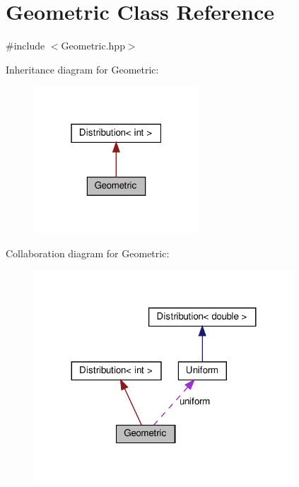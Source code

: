 \hypertarget{class_geometric}{}\section{Geometric Class Reference}
\label{class_geometric}


{\ttfamily \#include $<$Geometric.\+hpp$>$}



Inheritance diagram for Geometric\+:\nopagebreak
\begin{figure}[H]
\begin{center}
\leavevmode
\includegraphics[width=175pt]{class_geometric__inherit__graph}
\end{center}
\end{figure}


Collaboration diagram for Geometric\+:\nopagebreak
\begin{figure}[H]
\begin{center}
\leavevmode
\includegraphics[width=275pt]{class_geometric__coll__graph}
\end{center}
\end{figure}
